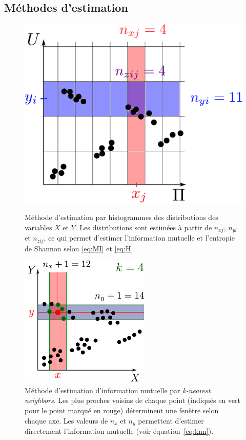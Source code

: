 \documentclass[../main]{subfiles}
\begin{document}
\subsection{Méthodes d'estimation}\label{sec:estimation}
\begin{figure}
    \begin{minipage}{0.4\textwidth}
    \centering
    \includegraphics[width=\textwidth]{boxes}
    \caption{Méthode d'estimation par histogrammes des distributions des variables $X$ et $Y$. Les distributions sont estimées à partir de $n_{xj}$, $n_{yi}$ et $n_{zij}$, ce qui permet d'estimer l'information mutuelle et l'entropie de Shannon selon \ref{eq:MI} et \ref{eq:H}}
    \label{fig:binning}  
    \end{minipage}
    \hfill
    \begin{minipage}{0.55\textwidth}    
            \centering
            \includegraphics[width=0.55\textwidth]{kraskov.pdf}
            \caption{Méthode d'estimation d'information mutuelle par \emph{k-nearest neighbors}. Les plus proches voisins de chaque point (indiqués en vert pour le point marqué en rouge) déterminent une fenêtre selon chaque axe. Les valeurs de $n_x$ et $n_y$ permettent d'estimer directement l'information mutuelle (voir équation~\ref{eq:knn}).}
            \label{fig:kraskov}
    \end{minipage}
    \end{figure}
\end{document}
